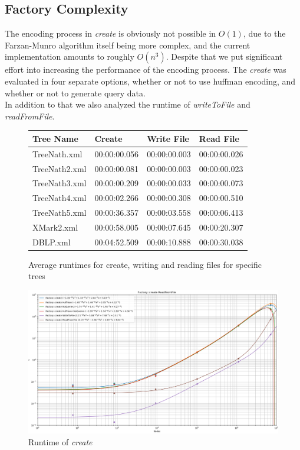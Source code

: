 \documentclass{article}
\begin{document}
\subsection{Factory Complexity} \label{Factory Complexity}
The encoding process in \textit{create} is obviously not possible in $O(1)$, due to the Farzan-Munro algorithm itself being more complex, and the current implementation amounts to roughly $O(n^{3})$. Despite that we put significant effort into increasing the performance of the encoding process. The \textit{create} was evaluated in four separate options, whether or not to use huffman encoding, and whether or not to generate query data.\\
In addition to that we also analyzed the runtime of \textit{writeToFile} and \textit{readFromFile}.
\begin{figure}[H]
	\begin{tabular}{ |p{3cm}||p{}|p{}|p{}| }
		 \hline
		 Tree Name & Create & Write File &Read File\\
		 \hline
		 TreeNath.xml   & 00:00:00.056    & 00:00:00.003 &   00:00:00.026 \\
		 TreeNath2.xml&   00:00:00.081  & 00:00:00.003   & 00:00:00.023 \\
		 TreeNath3.xml&00:00:00.209 &00:00:00.033&  00:00:00.073\\
		 TreeNath4.xml&00:00:02.266& 00:00:00.308&  00:00:00.510\\
		 TreeNath5.xml&00:00:36.357&00:00:03.558&00:00:06.413\\
		 XMark2.xml&00:00:58.005&00:00:07.645&00:00:20.307\\
		 DBLP.xml&00:04:52.509&00:00:10.888&00:00:30.038\\
		 \hline
	\end{tabular}
\caption{Average runtimes for create, writing and reading files for specific trees}
\label{complexFac:table1}
\end{figure}
\begin{figure}[H]
\includegraphics[scale=0.3]{file_compare_cut}
\caption{Runtime of \textit{create}}
\label{complexFac:image1}
\end{figure}
\end{document}

